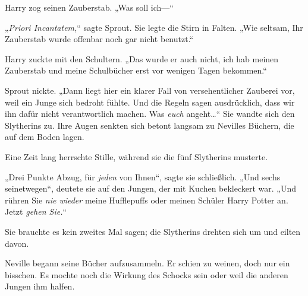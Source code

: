 Harry zog seinen Zauberstab. „Was soll ich—“

„\emph{Priori Incantatem,}“ sagte Sprout. Sie legte die Stirn in Falten. „Wie seltsam, Ihr Zauberstab wurde offenbar noch gar nicht benutzt.“

Harry zuckte mit den Schultern. „Das wurde er auch nicht, ich hab meinen Zauberstab und meine Schulbücher erst vor wenigen Tagen bekommen.“

Sprout nickte. „Dann liegt hier ein klarer Fall von versehentlicher Zauberei vor, weil ein Junge sich bedroht fühlte. Und die Regeln sagen ausdrücklich, dass wir ihn dafür nicht verantwortlich machen. Was \emph{euch} angeht…“ Sie wandte sich den Slytherins zu. Ihre Augen senkten sich betont langsam zu Nevilles Büchern, die auf dem Boden lagen.

Eine Zeit lang herrschte Stille, während sie die fünf Slytherins musterte.

„Drei Punkte Abzug, für \emph{jeden} von Ihnen“, sagte sie schließlich. „Und sechs seinetwegen“, deutete sie auf den Jungen, der mit Kuchen bekleckert war. „Und rühren Sie \emph{nie wieder} meine Hufflepuffs oder meinen Schüler Harry Potter an. Jetzt \emph{gehen Sie.}“

Sie brauchte es kein zweites Mal sagen; die Slytherins drehten sich um und eilten davon.

Neville begann seine Bücher aufzusammeln. Er schien zu weinen, doch nur ein bisschen. Es mochte noch die Wirkung des Schocks sein oder weil die anderen Jungen ihm halfen.

